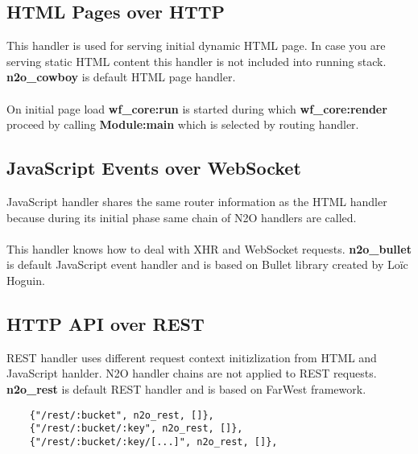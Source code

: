 \subsection{HTML Pages over HTTP}
This handler is used for serving initial dynamic HTML page.
In case you are serving static HTML content this handler is
not included into running stack. {\bf {n2o}\_{cowboy}} is
default HTML page handler.

\paragraph{}
On initial page load {\bf {wf}\_{core}:run} is started during
which {\bf {wf}\_{core}:render} proceed by calling {\bf Module:main} which
is selected by routing handler.

\subsection{JavaScript Events over WebSocket}
JavaScript handler shares the same router information as the
HTML handler because during its initial phase same chain
of N2O handlers are called.

\paragraph{}
This handler knows how to deal with XHR and WebSocket requests.
{\bf {n2o}\_{bullet}} is default JavaScript event handler
and is based on Bullet library created by Loïc Hoguin.

\newpage
\subsection{HTTP API over REST}
REST handler uses different request context initizlization
from HTML and JavaScript hanlder. N2O handler chains are not
applied to REST requests. {\bf {n2o}\_{rest}} is default REST
handler and is based on FarWest framework.

\vspace{1\baselineskip}
\begin{lstlisting}
    {"/rest/:bucket", n2o_rest, []},
    {"/rest/:bucket/:key", n2o_rest, []},
    {"/rest/:bucket/:key/[...]", n2o_rest, []},
\end{lstlisting}

